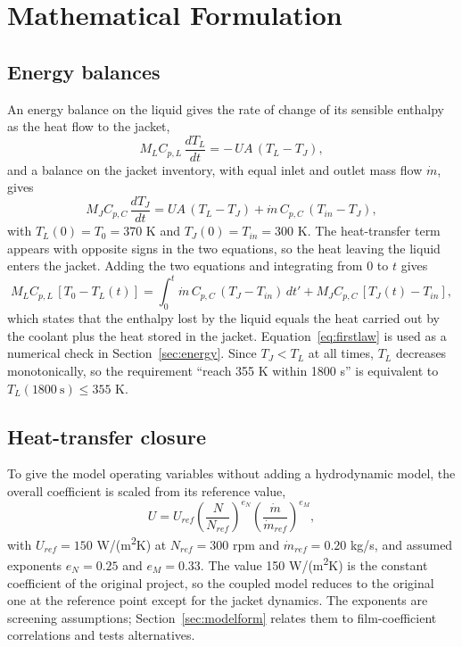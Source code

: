 \documentclass[11pt,letterpaper]{article}
\newcommand{\mdot}{\dot m}
\begin{document}
\section{Mathematical Formulation}

\subsection{Energy balances}
An energy balance on the liquid gives the rate of change of its sensible enthalpy as the heat flow to the jacket,
\begin{equation}
M_L C_{p,L}\,\frac{dT_L}{dt} = -\,U A\,(T_L - T_J), \label{eq:liquid}
\end{equation}
and a balance on the jacket inventory, with equal inlet and outlet mass flow \(\mdot\), gives
\begin{equation}
M_J C_{p,C}\,\frac{dT_J}{dt} = U A\,(T_L - T_J) + \mdot\, C_{p,C}\,(T_{in} - T_J), \label{eq:jacket}
\end{equation}
with \(T_L(0)=T_0=370\) K and \(T_J(0)=T_{in}=300\) K. The heat-transfer term appears with opposite signs in the two equations, so the heat leaving the liquid enters the jacket. Adding the two equations and integrating from 0 to \(t\) gives
\begin{equation}
M_L C_{p,L}\,[T_0 - T_L(t)] = \int_0^t \mdot\,C_{p,C}\,(T_J - T_{in})\,dt' + M_J C_{p,C}\,[T_J(t) - T_{in}], \label{eq:firstlaw}
\end{equation}
which states that the enthalpy lost by the liquid equals the heat carried out by the coolant plus the heat stored in the jacket. Equation~\ref{eq:firstlaw} is used as a numerical check in Section~\ref{sec:energy}. Since \(T_J < T_L\) at all times, \(T_L\) decreases monotonically, so the requirement ``reach 355 K within 1800 s'' is equivalent to \(T_L(1800\ \mathrm{s}) \le 355\) K.

\subsection{Heat-transfer closure}\label{sec:closure}
To give the model operating variables without adding a hydrodynamic model, the overall coefficient is scaled from its reference value,
\begin{equation}
U = U_{ref}\left(\frac{N}{N_{ref}}\right)^{e_N}\left(\frac{\mdot}{\mdot_{ref}}\right)^{e_M}, \label{eq:closure}
\end{equation}
with \(U_{ref}=150\) W/(m\textsuperscript{2}K) at \(N_{ref}=300\) rpm and \(\mdot_{ref}=0.20\) kg/s, and assumed exponents \(e_N=0.25\) and \(e_M=0.33\). The value 150 W/(m\textsuperscript{2}K) is the constant coefficient of the original project, so the coupled model reduces to the original one at the reference point except for the jacket dynamics. The exponents are screening assumptions; Section~\ref{sec:modelform} relates them to film-coefficient correlations and tests alternatives.
\end{document}
